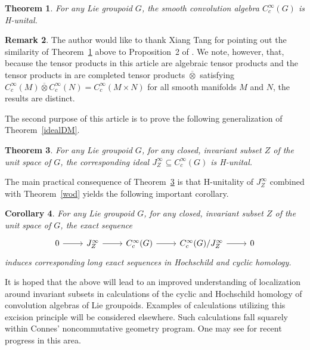 \documentclass[12pt]{article}
\theoremstyle{plain}
\newtheorem{thm}{Theorem}[section]
\newtheorem{cor}[thm]{Corollary}
\theoremstyle{definition}
\newtheorem{rmk}[thm]{Remark}
\numberwithin{equation}{section}
\begin{document}
\begin{thm}\label{mainthm1}
For any Lie groupoid $G$, the smooth convolution algebra $C_c^\infty(G)$ is H-unital.
\end{thm}

\begin{rmk}
The author would like to thank Xiang Tang for pointing out the similarity of Theorem~\ref{mainthm1} above to Proposition~2 of \cite{Crainic-Moerdijk}. We note, however, that, because the tensor products in this article are algebraic tensor products and the tensor products in \cite{Crainic-Moerdijk} are completed tensor products $\overline\otimes$ satisfying $C_c^\infty(M) \overline\otimes C_c^\infty(N) = C_c^\infty(M \times N)$  for all  smooth manifolds $M$ and $N$, the results are   distinct.
\end{rmk}


The second purpose of this article is to prove the following generalization of Theorem~\ref{idealDM}.

\begin{thm}\label{mainthm2}
For any Lie groupoid $G$, for any closed, invariant subset $Z$ of the unit space of $G$,  the corresponding ideal $J_Z^\infty \subseteq C_c^\infty(G)$ is H-unital.
\end{thm}



The main practical consequence of Theorem~\ref{mainthm2} is that H-unitality of $J_Z^\infty$ combined with Theorem~\ref{wod} yields the following important corollary.

\begin{cor}\label{excision1}
For any Lie groupoid $G$, for any closed, invariant subset $Z$ of the unit space of $G$, the exact sequence
\[ \begin{tikzcd}
0 \ar[r] & J_Z^\infty \ar[r] & C_c^\infty(G) \ar[r] & C_c^\infty(G)/J_Z^\infty \ar[r] & 0
\end{tikzcd} \]
induces corresponding long exact sequences in Hochschild and cyclic homology.
\end{cor}

It is hoped that the above will lead to an improved  understanding of localization around invariant subsets in  calculations of the cyclic and Hochschild homology of convolution algebras of Lie groupoids. Examples of calculations utilizing this excision principle will be considered elsewhere.  Such calculations fall squarely within Connes' noncommutative geometry program. One may see \cite{Pflaum-Posthuma-Tang} for recent progress in this area.
\end{document}
